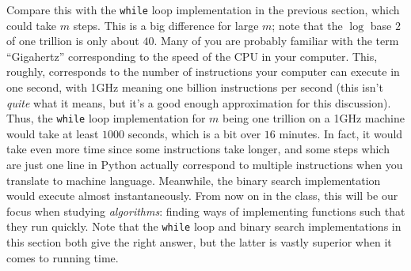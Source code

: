 \documentclass[11pt]{article}
\begin{document}
Compare this with the \texttt{while} loop
implementation in the previous section, which could take $m$
steps. This is a big difference for large $m$; note that the $\log$
base $2$ of one trillion is only about $40$.  Many of you are probably
familiar with the term ``Gigahertz'' corresponding to the speed of the
CPU in your computer.  This, roughly, corresponds to the number of
instructions your computer can execute in one second, with 1GHz
meaning one billion instructions per second (this isn't {\em quite}
what it means, but it's a good enough approximation for this
discussion).  Thus, the
\texttt{while} loop implementation for $m$ being one trillion on a
1GHz machine would
take at least $1000$ seconds, which is a bit over $16$ minutes. In
fact, it
would take even more time since some instructions take longer, and
some steps which are just one line in Python actually correspond to
multiple
instructions when you translate to machine language.  Meanwhile, the
binary search implementation would execute almost
instantaneously. From now on in the class, this will be our focus when
studying {\em algorithms}: finding ways of implementing functions
such that they run quickly.  Note that the \texttt{while} loop and
binary search implementations in this section both give the right
answer, but the latter is vastly superior when it comes to running
time.
\end{document}
